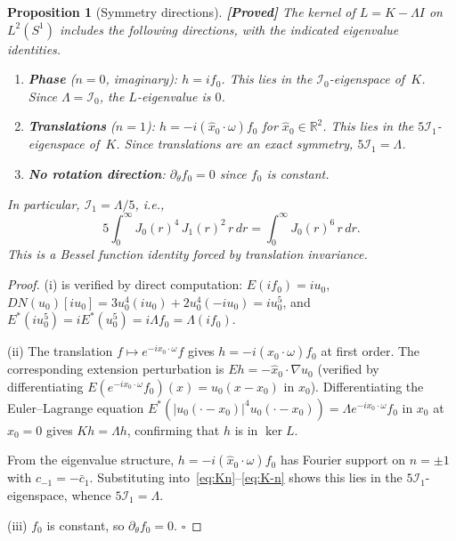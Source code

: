 \documentclass[12pt]{article}
\newtheorem{proposition}[theorem]{Proposition}
\theoremstyle{definition}
\theoremstyle{remark}
\newcommand{\R}{\mathbb{R}}
\newcommand{\proven}{\textbf{\color{teal}[Proved]}}
\begin{document}
\begin{proposition}[Symmetry directions]
  \label{prop:symmetry-kernel}
  \proven\quad
  The kernel of $L=K-\Lambda I$ on $L^2(S^1)$ includes the following
  directions, with the indicated eigenvalue identities.
  \begin{enumerate}[leftmargin=2em]
    \item \textbf{Phase} ($n=0$, imaginary):
      $h=if_0$.  This lies in the $\mathcal I_0$-eigenspace of~$K$.
      Since $\Lambda=\mathcal I_0$, the $L$-eigenvalue is $0$.
    \item \textbf{Translations} ($n=1$):
      $h=-i(\hat x_0\cdot\omega)f_0$ for $\hat x_0\in\R^2$.
      This lies in the $5\mathcal I_1$-eigenspace of~$K$.
      Since translations are an exact symmetry, $5\mathcal I_1=\Lambda$.
    \item \textbf{No rotation direction}:
      $\partial_\theta f_0=0$ since $f_0$ is constant.
  \end{enumerate}
  In particular, $\mathcal I_1=\Lambda/5$, i.e.,
  \begin{equation}  \label{eq:bessel-identity}
    5\int_0^\infty J_0(r)^4\,J_1(r)^2\,r\,dr
    = \int_0^\infty J_0(r)^6\,r\,dr.
  \end{equation}
  This is a Bessel function identity forced by translation invariance.
\end{proposition}

\begin{proof}
  (i) is verified by direct computation: $E(if_0)=iu_0$,
  $DN(u_0)[iu_0]=3u_0^4(iu_0)+2u_0^4(-iu_0)=iu_0^5$, and
  $E^*(iu_0^5)=iE^*(u_0^5)=i\Lambda f_0=\Lambda(if_0)$.

  (ii) The translation $f\mapsto e^{-ix_0\cdot\omega}f$ gives
  $h=-i(\hat x_0\cdot\omega)f_0$ at first order.  The corresponding
  extension perturbation is $Eh=-\hat x_0\cdot\nabla u_0$
  (verified by differentiating $E(e^{-ix_0\cdot\omega}f_0)(x)=u_0(x-x_0)$
  in $x_0$).  Differentiating the Euler--Lagrange equation
  $E^*(|u_0(\cdot-x_0)|^4 u_0(\cdot-x_0))=\Lambda e^{-ix_0\cdot\omega}f_0$
  in $x_0$ at $x_0=0$ gives $Kh=\Lambda h$, confirming that $h$ is in
  $\ker L$.

  From the eigenvalue structure, $h=-i(\hat x_0\cdot\omega)f_0$ has
  Fourier support on $n=\pm 1$ with $c_{-1}=-\bar c_1$.  Substituting
  into~\eqref{eq:Kn}--\eqref{eq:K-n} shows this lies in the
  $5\mathcal I_1$-eigenspace, whence $5\mathcal I_1=\Lambda$.

  (iii) $f_0$ is constant, so $\partial_\theta f_0=0$. $\square$
\end{proof}
\end{document}
